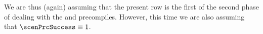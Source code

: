 \begin{center}
\end{center}
We are thus (again) assuming that the present row is the first of the second phase of dealing with the 
 and
 precompiles.
However, this time we are also assuming that $\scenPrcSuccess \equiv 1$.

